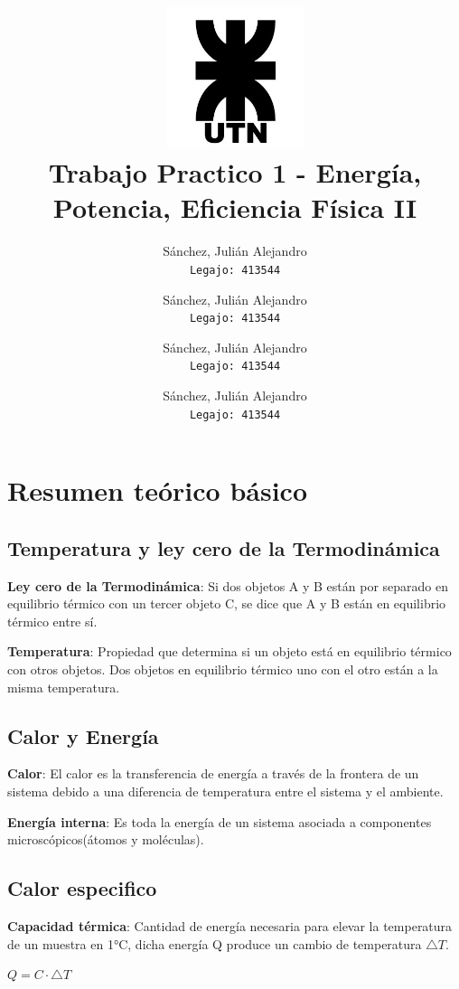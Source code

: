 \documentclass[]{article}
\title{\includegraphics[width=4cm]{UTN_logo.jpg}\\[2cm]Trabajo Practico 1 - Energía, Potencia, Eficiencia \textbf{Física II}}
\author{
	Sánchez, Julián Alejandro\\
	\texttt{Legajo: 413544}
	\and
	Sánchez, Julián Alejandro\\
	\texttt{Legajo: 413544}
	\and
	Sánchez, Julián Alejandro\\
	\texttt{Legajo: 413544}
	\and
	Sánchez, Julián Alejandro\\
	\texttt{Legajo: 413544}
}
\begin{document}
\maketitle

\newpage
\section{Resumen teórico básico}

\subsection{Temperatura y ley cero de la Termodinámica}
\begin{flushleft}
	\textbf{Ley cero de la Termodinámica}: Si dos objetos A y B están por separado en equilibrio térmico con un tercer objeto C, se dice que A y B están en equilibrio térmico entre sí.
\end{flushleft}
\begin{flushleft}
	\textbf{Temperatura}: Propiedad que determina si un objeto está en equilibrio térmico con otros objetos. Dos objetos en equilibrio térmico uno con el otro están a la misma temperatura.
\end{flushleft}


\subsection{Calor y Energía}
\begin{flushleft}
	\textbf{Calor}: El calor es la transferencia de energía a través de la frontera de un sistema debido a una diferencia de temperatura entre el sistema y el ambiente.
\end{flushleft}

\begin{flushleft}
	\textbf{Energía interna}: Es toda la energía de un sistema asociada a componentes microscópicos(átomos y moléculas).
\end{flushleft}

\subsection{Calor especifico}
\begin{flushleft}
	\textbf{Capacidad térmica}: Cantidad de energía necesaria para elevar la temperatura de un muestra en 1°C, dicha energía Q produce un cambio de temperatura $\bigtriangleup T$. 
	
	\begin{center}
		$Q = C \cdot \bigtriangleup T$
	\end{center}
\end{flushleft}
\end{document}
